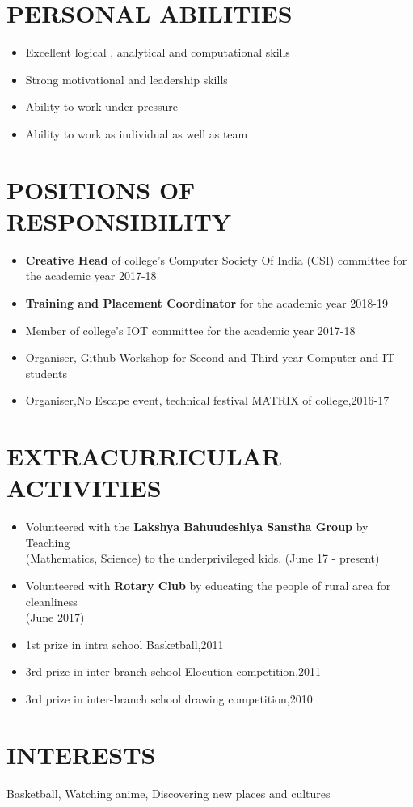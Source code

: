 \documentclass[11pt]{article} %
\newcommand{\NewPart}[1]{\section*{\uppercase{#1}}}
\begin{document}
 
 
\NewPart{    Personal Abilities}{}

\begin{itemize}
\itemsep-0.5em 
\item Excellent logical , analytical and computational skills
\item Strong motivational and leadership skills
\item Ability to work under pressure 
\item Ability to work as individual as well as team 
\end{itemize}

\NewPart{  Positions of Responsibility}{}

\begin{itemize}
\itemsep-0.5em 
\item \textbf{Creative Head} of college’s Computer Society Of India (CSI) committee for the academic year 2017-18
\item \textbf{Training and Placement Coordinator} for the academic year 2018-19
\item Member of college’s IOT committee for the academic year 2017-18
\item Organiser, Github Workshop for Second and Third year Computer and IT students 
\item Organiser,No Escape event, technical festival MATRIX of college,2016-17 
\end{itemize}
\NewPart{  Extracurricular Activities}{}

\begin{itemize}
\itemsep-0.5em 
	
\item Volunteered with the \textbf{Lakshya Bahuudeshiya Sanstha Group} by Teaching \\(Mathematics, Science) to the underprivileged kids. (June 17 - present)
\item Volunteered with \textbf{Rotary Club} by educating the people of rural area for cleanliness
\\(June 2017)
\item 1st prize in intra school Basketball,2011
\item 3rd prize in inter-branch school Elocution competition,2011
\item 3rd prize in inter-branch school drawing competition,2010
\end{itemize}

\NewPart{ Interests}{}
Basketball, Watching anime, Discovering new places and cultures
\end{document}
